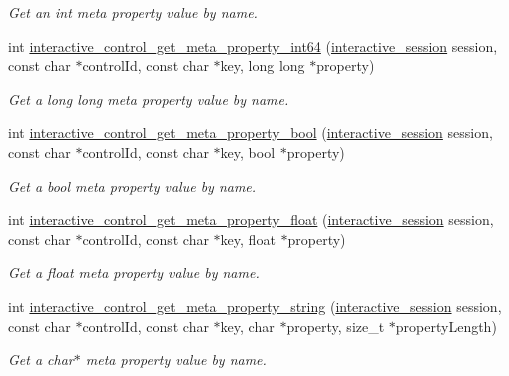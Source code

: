 \begin{DoxyCompactItemize}
\begin{DoxyCompactList}\small\item\em Get an {\ttfamily int} meta property value by name. \end{DoxyCompactList}\item 
int \mbox{\hyperlink{group___interactivity_ga18c08c14894dfe7dc3ef7b5d541aac60}{interactive\+\_\+control\+\_\+get\+\_\+meta\+\_\+property\+\_\+int64}} (\mbox{\hyperlink{group___interactivity_ga6d8819d38b8dc8994a2299cf22a65a31}{interactive\+\_\+session}} session, const char $\ast$control\+Id, const char $\ast$key, long long $\ast$property)
\begin{DoxyCompactList}\small\item\em Get a {\ttfamily long long} meta property value by name. \end{DoxyCompactList}\item 
int \mbox{\hyperlink{group___interactivity_ga42e0b33e56ea2cc4710ec4efb2b57175}{interactive\+\_\+control\+\_\+get\+\_\+meta\+\_\+property\+\_\+bool}} (\mbox{\hyperlink{group___interactivity_ga6d8819d38b8dc8994a2299cf22a65a31}{interactive\+\_\+session}} session, const char $\ast$control\+Id, const char $\ast$key, bool $\ast$property)
\begin{DoxyCompactList}\small\item\em Get a {\ttfamily bool} meta property value by name. \end{DoxyCompactList}\item 
int \mbox{\hyperlink{group___interactivity_gac40a0df234fecd3723d058aef3e05bda}{interactive\+\_\+control\+\_\+get\+\_\+meta\+\_\+property\+\_\+float}} (\mbox{\hyperlink{group___interactivity_ga6d8819d38b8dc8994a2299cf22a65a31}{interactive\+\_\+session}} session, const char $\ast$control\+Id, const char $\ast$key, float $\ast$property)
\begin{DoxyCompactList}\small\item\em Get a {\ttfamily float} meta property value by name. \end{DoxyCompactList}\item 
int \mbox{\hyperlink{group___interactivity_gacffbeb973287f6bdaac8e7aa4c96b6d4}{interactive\+\_\+control\+\_\+get\+\_\+meta\+\_\+property\+\_\+string}} (\mbox{\hyperlink{group___interactivity_ga6d8819d38b8dc8994a2299cf22a65a31}{interactive\+\_\+session}} session, const char $\ast$control\+Id, const char $\ast$key, char $\ast$property, size\+\_\+t $\ast$property\+Length)
\begin{DoxyCompactList}\small\item\em Get a {\ttfamily char$\ast$} meta property value by name. \end{DoxyCompactList}\item 

\end{DoxyCompactItemize}
